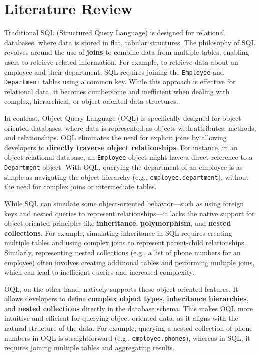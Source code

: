 \documentclass{article}
\begin{document}
\section{Literature Review}

Traditional SQL (Structured Query Language) is designed for relational databases, where data is stored in flat, tabular structures. The philosophy of SQL revolves around the use of \textbf{joins} to combine data from multiple tables, enabling users to retrieve related information. For example, to retrieve data about an employee and their department, SQL requires joining the \texttt{Employee} and \texttt{Department} tables using a common key. While this approach is effective for relational data, it becomes cumbersome and inefficient when dealing with complex, hierarchical, or object-oriented data structures\cite{w3s}.

In contrast, Object Query Language (OQL) is specifically designed for object-oriented databases, where data is represented as objects with attributes, methods, and relationships. OQL eliminates the need for explicit joins by allowing developers to \textbf{directly traverse object relationships}. For instance, in an object-relational database, an \texttt{Employee} object might have a direct reference to a \texttt{Department} object. With OQL, querying the department of an employee is as simple as navigating the object hierarchy (e.g., \texttt{employee.department}), without the need for complex joins or intermediate tables\cite{mendix}.

While SQL can simulate some object-oriented behavior---such as using foreign keys and nested queries to represent relationships---it lacks the native support for object-oriented principles like \textbf{inheritance}, \textbf{polymorphism}, and \textbf{nested collections}. For example, simulating inheritance in SQL requires creating multiple tables and using complex joins to represent parent-child relationships. Similarly, representing nested collections (e.g., a list of phone numbers for an employee) often involves creating additional tables and performing multiple joins, which can lead to inefficient queries and increased complexity\cite{ibm}.

OQL, on the other hand, natively supports these object-oriented features. It allows developers to define \textbf{complex object types}, \textbf{inheritance hierarchies}, and \textbf{nested collections} directly in the database schema. This makes OQL more intuitive and efficient for querying object-oriented data, as it aligns with the natural structure of the data. For example, querying a nested collection of phone numbers in OQL is straightforward (e.g., \texttt{employee.phones}), whereas in SQL, it requires joining multiple tables and aggregating results\cite{mendix}.
\end{document}
